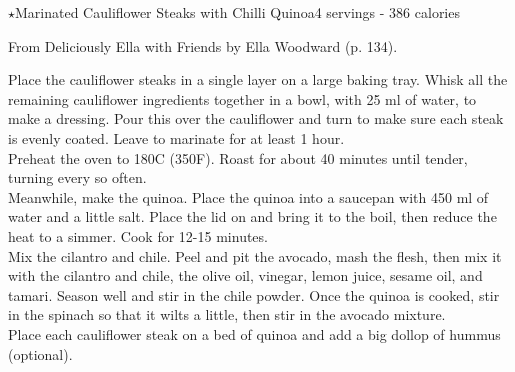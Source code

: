 \begin{recipe}{$\star$Marinated Cauliflower Steaks with Chilli Quinoa}{4 servings - 386 calories}{}

\freeform From {\normalfont Deliciously Ella with Friends} by Ella Woodward (p. 134).


Place the cauliflower steaks in a single layer on a large baking tray. Whisk all the remaining cauliflower ingredients together in a bowl, with 25 ml of water, to make a dressing. Pour this over the cauliflower and turn to make sure each steak is evenly coated. Leave to marinate for at least 1 hour.\\

Preheat the oven to 180\textdegree C (350\textdegree F). Roast for about 40 minutes until tender, turning every so often.\\

Meanwhile, make the quinoa. Place the quinoa into a saucepan with 450 ml of water and a little salt. Place the lid on and bring it to the boil, then reduce the heat to a simmer. Cook for 12-15 minutes.\\

Mix the cilantro and chile. Peel and pit the avocado, mash the flesh, then mix it with the cilantro and chile, the olive oil, vinegar, lemon juice, sesame oil, and tamari. Season well and stir in the chile powder. Once the quinoa is cooked, stir in the spinach so that it wilts a little, then stir in the avocado mixture.\\

Place each cauliflower steak on a bed of quinoa and add a big dollop of hummus (optional).

\end{recipe}